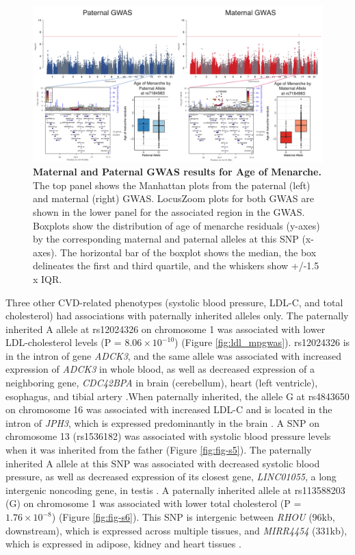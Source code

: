 \begin{figure}[!htb]
\centering \includegraphics[width=6in]{img/ch02/fig-01-menarche_matpatgwas.pdf}
\caption[Maternal and Paternal GWAS results for Age of Menarche.]{\textbf{Maternal and Paternal GWAS results for Age of Menarche.}  The top panel shows the Manhattan plots from the paternal (left) and maternal (right) GWAS. LocusZoom plots for both GWAS are shown in the lower panel for the associated region in the GWAS. Boxplots show the distribution of age of menarche residuals (y-axes) by the corresponding maternal and paternal alleles at this SNP (x-axes). The horizontal bar of the boxplot shows the median, the box delineates the first and third quartile, and the whiskers show +/-1.5 x IQR.}
\label{fig:menarche_mpgwas}
\end{figure}

Three other CVD-related phenotypes (systolic blood pressure, LDL-C, and total cholesterol) had associations with paternally inherited alleles only. The paternally inherited A allele at rs12024326 on chromosome 1 was associated with lower LDL-cholesterol levels (P = $ 8.06 \times 10^{-10}$) (Figure \ref{fig:ldl_mpgwas}). rs12024326 is in the intron of gene \emph{ADCK3}, and the same allele was associated with increased expression of \emph{ADCK3} in whole blood, as well as decreased expression of a neighboring gene, \emph{CDC42BPA} in brain (cerebellum), heart (left ventricle), esophagus, and tibial artery \cite{Consortium2015}.When paternally inherited, the allele G at rs4843650 on chromosome 16 was associated with increased LDL-C and is located in the intron of \emph{JPH3}, which is expressed predominantly in the brain \cite{Consortium2015}. A SNP on chromosome 13 (rs1536182) was associated with systolic blood pressure levels when it was inherited from the father (Figure \ref{fig:fig-s5}). The paternally inherited A allele at this SNP was associated with decreased systolic blood pressure, as well as decreased expression of its closest gene, \emph{LINC01055}, a long intergenic noncoding gene, in testis \cite{Consortium2015}. A paternally inherited allele at rs113588203 (G) on chromosome 1 was associated with lower total cholesterol (P = $1.76 \times 10^{-8}$) (Figure \ref{fig:fig-s6}). This SNP is intergenic between \emph{RHOU} (96kb, downstream), which is expressed across multiple tissues, and \emph{MIRR4454} (331kb), which is expressed in adipose, kidney and heart tissues \cite{Consortium2015}. 


